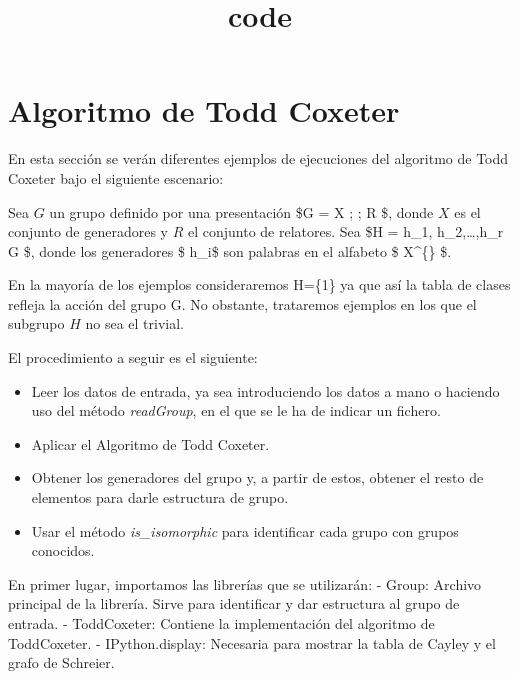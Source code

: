 \documentclass[11pt]{article}
\title{code}
\providecommand{\tightlist}{%
      \setlength{\itemsep}{0pt}\setlength{\parskip}{0pt}}
\begin{document}
    
    \maketitle
    
    

    
    \hypertarget{algoritmo-de-todd-coxeter}{%
\section{Algoritmo de Todd Coxeter}\label{algoritmo-de-todd-coxeter}}

En esta sección se verán diferentes ejemplos de ejecuciones del
algoritmo de Todd Coxeter bajo el siguiente escenario:

Sea \(G\) un grupo definido por una presentación \$G = \langle X ;
\textbar{} ; R \rangle \$, donde \(X\) es el conjunto de generadores y
\(R\) el conjunto de relatores. Sea \$H = \langle h\_1, h\_2,\ldots,h\_r
\rangle \leq G \$, donde los generadores \$ h\_i\$ son palabras en el
alfabeto \$ X\^{}\{\} \$.

\begin{remark}
En la mayoría de los ejemplos consideraremos H=\{1\} ya que así la tabla de clases refleja la acción del grupo G. No obstante, trataremos ejemplos en los que el subgrupo $H$ no sea el trivial.
\end{remark}

El procedimiento a seguir es el siguiente:

\begin{itemize}
\tightlist
\item
  Leer los datos de entrada, ya sea introduciendo los datos a mano o
  haciendo uso del método \textit{readGroup}, en el que se le ha de
  indicar un fichero.
\item
  Aplicar el Algoritmo de Todd Coxeter.
\item
  Obtener los generadores del grupo y, a partir de estos, obtener el
  resto de elementos para darle estructura de grupo.
\item
  Usar el método \textit{is\_isomorphic} para identificar cada grupo con
  grupos conocidos.
\end{itemize}

    En primer lugar, importamos las librerías que se utilizarán: - Group:
Archivo principal de la librería. Sirve para identificar y dar
estructura al grupo de entrada. - ToddCoxeter: Contiene la
implementación del algoritmo de ToddCoxeter. - IPython.display:
Necesaria para mostrar la tabla de Cayley y el grafo de Schreier.
\end{document}
